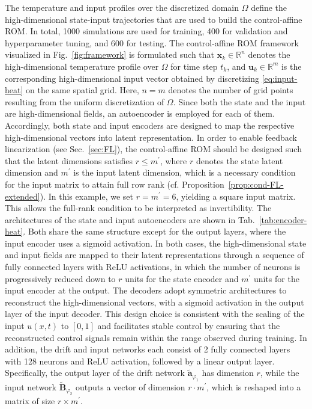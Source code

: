 \documentclass{article}
\begin{document}
The temperature and input profiles over the discretized domain $\Omega$ define the high-dimensional state-input trajectories that are used to build the control-affine ROM.
In total, 1000 simulations are used for training, 400 for validation and hyperparameter tuning, and 600 for testing.
The control-affine ROM framework visualized in Fig.~\ref{fig:framework} is formulated such that $\mathbf{x}_k \in \mathbb{R}^n$ denotes the high-dimensional temperature profile over $\Omega$ for time step $t_k$, and $\mathbf{u}_k \in \mathbb{R}^m$ is the corresponding high-dimensional input vector obtained by discretizing \eqref{eq:input-heat} on the same spatial grid.
Here, $n=m$ denotes the number of grid points resulting from the uniform discretization of $\Omega$.
Since both the state and the input are high-dimensional fields, an autoencoder is employed for each of them.
Accordingly, both state and input encoders are designed to map the respective high-dimensional vectors into latent representation.
In order to enable feedback linearization (see Sec.~\ref{sec:FL}), the control-affine ROM should be designed such that the latent dimensions satisfies $r\le m^\prime$, where $r$ denotes the state latent dimension and $m^\prime$ is the input latent dimension, which is a necessary condition for the input matrix to attain full row rank (cf. Proposition~\ref{prop:cond-FL-extended}).
In this example, we set $r=m^\prime=6$, yielding a square input matrix.
This allows the full-rank condition to be interpreted as invertibility.
The architectures of the state and input autoencoders are shown in Tab.~\ref{tab:encoder-heat}.
Both share the same structure except for the output layers, where the input encoder uses a sigmoid activation.
In both cases, the high-dimensional state and input fields are mapped to their latent representations through a sequence of fully connected layers with ReLU activations, in which the number of neurons is progressively reduced down to $r$ units for the state encoder and $m^\prime$ units for the input encoder at the output.
The decoders adopt symmetric architectures to reconstruct the high-dimensional vectors, with a sigmoid activation in the output layer of the input decoder.
This design choice is consistent with the scaling of the input $u(x,t)$ to $[0,1]$
and facilitates stable control by ensuring that the reconstructed control signals remain within the range observed during training.
In addition, the drift and input networks each consist of 2 fully connected layers with 128 neurons and ReLU activation, followed by a linear output layer.
Specifically, the output layer of the drift network $\widetilde{\mathbf{a}}_{\varphi_1}$ has dimension $r$, while the input network $\widetilde{\mathbf{B}}_{\varphi_2}$ outputs a vector of dimension $r\cdot m^\prime$, which is reshaped into a matrix of size $r \times m^\prime$.
\end{document}
